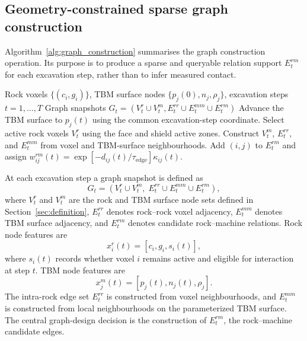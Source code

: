 \subsection{Geometry-constrained sparse graph construction}
\label{sec:construction}
Algorithm~\ref{alg:graph_construction} summarises the graph construction
operation. Its purpose is to produce a sparse and queryable relation support
$E_t^{rm}$ for each excavation step, rather than to infer measured contact.

\begin{algorithm}[htbp]
\caption{Geometry-constrained sparse graph construction}
\label{alg:graph_construction}
\begin{algorithmic}[1]
\REQUIRE Rock voxels $\{(c_i,g_i)\}$, TBM surface nodes $\{p_j(0),n_j,\rho_j\}$, excavation steps $t=1,\ldots,T$
\ENSURE Graph snapshots $G_t=(V_t^r\cup V_t^m,E_t^{rr}\cup E_t^{mm}\cup E_t^{rm})$
\STATE Advance the TBM surface to $p_j(t)$ using the common excavation-step coordinate.
\STATE Select active rock voxels $V_t^r$ using the face and shield active zones.
\STATE Construct $V_t^m$, $E_t^{rr}$, and $E_t^{mm}$ from voxel and TBM-surface neighbourhoods.
\STATE Add $(i,j)$ to $E_t^{rm}$ and assign $w_{ij}^{rm}(t)=\exp[-d_{ij}(t)/\tau_{\mathrm{edge}}]\kappa_{ij}(t)$.
\ENDIF
\ENDFOR
\ENDFOR
\end{algorithmic}
\end{algorithm}

At each excavation step a graph snapshot is defined as
\[
G_t=\left(V_t^r \cup V_t^m,\; E_t^{rr} \cup E_t^{mm} \cup E_t^{rm}\right),
\]
where $V_t^r$ and $V_t^m$ are the rock and TBM surface node sets defined in
Section~\ref{sec:definition}, $E_t^{rr}$ denotes rock--rock voxel adjacency,
$E_t^{mm}$ denotes TBM surface adjacency, and $E_t^{rm}$ denotes candidate
rock--machine relations. Rock node features are
\[
x_i^r(t)=[c_i,g_i,s_i(t)],
\]
where $s_i(t)$ records whether voxel $i$ remains active and eligible for
interaction at step $t$. TBM node features are
\[
x_j^m(t)=[p_j(t),n_j(t),\rho_j].
\]
The intra-rock edge set $E_t^{rr}$ is constructed from voxel neighbourhoods,
and $E_t^{mm}$ is constructed from local neighbourhoods on the parameterized
TBM surface. The central graph-design decision is the construction of
$E_t^{rm}$, the rock--machine candidate edges.

